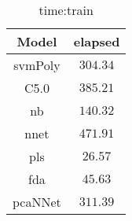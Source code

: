 \begin{table}[!ht]
	\centering
	\begin{tabular}{|c|c|}
		\hline
		Model & elapsed \\ \hline
		svmPoly & $304.34$ \\ \hline
		C5.0 & $385.21$ \\ \hline
		nb & $140.32$ \\ \hline
		nnet & $471.91$ \\ \hline
		pls & $26.57$ \\ \hline
		fda & $45.63$ \\ \hline
		pcaNNet & $311.39$ \\ \hline
	\end{tabular}
	\caption{time:train}
	\label{tab:time:train}
\end{table}
